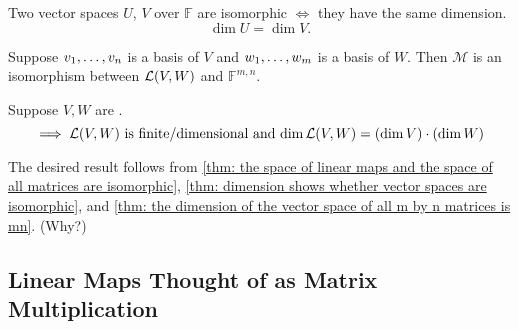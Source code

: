   \begin{thm}
    \label{thm: dimension shows whether vector spaces are isomorphic}
    Two \fd vector spaces $U$, $V$ over $\mathbb{F}$ are isomorphic $\iff$ they have the same dimension.
    \begin{equation}
      \dim U = \dim V.
    \end{equation}
  \end{thm}

  \begin{thm}
    \label{thm: the space of linear maps and the space of all matrices are isomorphic}
    Suppose $v_1, \dots, v_n$ is a basis of $V$ and $w_1, \dots, w_m$ is a basis of $W$. Then $\mathcal{M}$ is an isomorphism between ${\mathcal{L}(V,W)}$ and $\mathbb{F}^{m,n}$.
  \end{thm}

  \begin{thm}
    Suppose $V,W$ are \fd.
    \begin{equation}
      \implies \lvw $ is \fd and $\dim \lvw = (\dim V)\cdot(\dim W)
    \end{equation}
  \end{thm}
  \begin{prf}
    The desired result follows from \ref{thm: the space of linear maps and the space of all matrices are isomorphic}, \ref{thm: dimension shows whether vector spaces are isomorphic}, and \ref{thm: the dimension of the vector space of all m by n matrices is mn}. (Why?)
  \end{prf}

  \subsection{Linear Maps Thought of as Matrix Multiplication}

